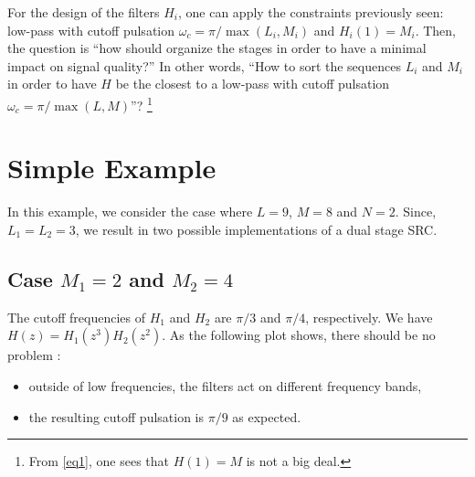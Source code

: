 \documentclass[11pt,a4paper,final]{article}
\begin{document}
For the design of the filters $H_i$, one can apply the constraints previously 
seen: low-pass with cutoff pulsation $\omega_c=\pi/\max(L_i,M_i)$ and 
$H_i(1)=M_i$. Then, the question is ``how should organize the stages in order 
to have a minimal impact on signal quality?'' In other words, ``How to sort 
the sequences $L_i$ and $M_i$ in order to have $H$ be the closest to a 
low-pass with cutoff pulsation $\omega_c=\pi/\max(L,M)$''?
\footnote{From \eqref{eq1}, one sees that $H(1)=M$ is not a big deal.}

\section{Simple Example}

In this example, we consider the case where $L=9$, $M=8$ and $N=2$. Since, 
$L_1=L_2=3$, we result in two possible implementations of a dual stage SRC.

\subsection{Case $M_1=2$ and $M_2=4$}

\begin{center}
\end{center}
The cutoff frequencies of $H_1$ and $H_2$ are $\pi/3$ and $\pi/4$, respectively.
We have $H(z)=H_1(z^3)H_2(z^2)$. As the following plot shows, there should be 
no problem :
\begin{itemize}
\item outside of low frequencies, the filters act on different 
frequency bands,
\item the resulting cutoff pulsation is $\pi/9$ as expected.
\end{itemize}
\end{document}
